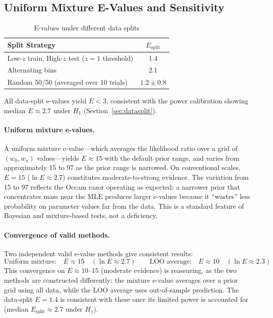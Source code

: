 \documentclass[11pt,a4paper]{article}
\begin{document}
\subsection{Uniform Mixture E-Values and Sensitivity}
\label{sec:mixture}

\begin{table}[H]
\centering
\caption{E-values under different data splits}
\label{tab:splits}
\begin{tabular}{@{}lc@{}}
\toprule
Split Strategy & $E_{\text{split}}$ \\
\midrule
Low-$z$ train, High-$z$ test ($z = 1$ threshold) & 1.4 \\
Alternating bins & 2.1 \\
Random 50/50 (averaged over 10 trials) & $1.2 \pm 0.8$ \\
\bottomrule
\end{tabular}
\end{table}

All data-split e-values yield $E < 3$, consistent with the power calibration showing median $E \approx 2.7$ under $H_1$ (Section~\ref{sec:datasplit}).

\paragraph{Uniform mixture e-values.} A uniform mixture e-value---which averages the likelihood ratio over a grid of $(w_0, w_a)$ values---yields $E \approx 15$ with the default prior range, and varies from approximately 15 to 97 as the prior range is narrowed. On conventional scales, $E = 15$ ($\ln E \approx 2.7$) constitutes moderate-to-strong evidence. The variation from 15 to 97 reflects the Occam razor operating as expected: a narrower prior that concentrates mass near the MLE produces larger e-values because it ``wastes'' less probability on parameter values far from the data. This is a standard feature of Bayesian and mixture-based tests, not a deficiency.

\paragraph{Convergence of valid methods.} Two independent valid e-value methods give consistent results:
\begin{equation}
\text{Uniform mixture:} \quad E \approx 15 \quad (\ln E \approx 2.7) \qquad \text{LOO average:} \quad E \approx 10 \quad (\ln E \approx 2.3)
\end{equation}
This convergence on $E \approx 10$--$15$ (moderate evidence) is reassuring, as the two methods are constructed differently: the mixture e-value averages over a prior grid using all data, while the LOO average uses out-of-sample prediction. The data-split $E = 1.4$ is consistent with these once its limited power is accounted for (median $E_{\text{split}} \approx 2.7$ under $H_1$).
\end{document}
